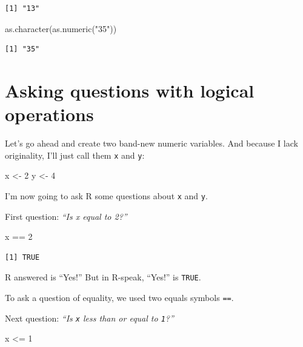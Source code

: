 \documentclass[
  letterpaper,
  DIV=11,
  numbers=noendperiod]{scrreprt}
\newenvironment{Shaded}{\begin{snugshade}}{\end{snugshade}}
\newcommand{\DecValTok}[1]{\textcolor[rgb]{0.68,0.00,0.00}{#1}}
\newcommand{\FunctionTok}[1]{\textcolor[rgb]{0.28,0.35,0.67}{#1}}
\newcommand{\NormalTok}[1]{\textcolor[rgb]{0.00,0.23,0.31}{#1}}
\newcommand{\OtherTok}[1]{\textcolor[rgb]{0.00,0.23,0.31}{#1}}
\newcommand{\SpecialCharTok}[1]{\textcolor[rgb]{0.37,0.37,0.37}{#1}}
\newcommand{\StringTok}[1]{\textcolor[rgb]{0.13,0.47,0.30}{#1}}
\begin{document}
\begin{verbatim}
[1] "13"
\end{verbatim}

\begin{Shaded}
\begin{Highlighting}[]
\FunctionTok{as.character}\NormalTok{(}\FunctionTok{as.numeric}\NormalTok{(}\StringTok{"35"}\NormalTok{))}
\end{Highlighting}
\end{Shaded}

\begin{verbatim}
[1] "35"
\end{verbatim}

\section{Asking questions with logical
operations}\label{asking-questions-with-logical-operations}

Let's go ahead and create two band-new numeric variables. And because I
lack originality, I'll just call them \texttt{x} and \texttt{y}:

\begin{Shaded}
\begin{Highlighting}[]
\NormalTok{x }\OtherTok{\textless{}{-}} \DecValTok{2}
\NormalTok{y }\OtherTok{\textless{}{-}} \DecValTok{4}
\end{Highlighting}
\end{Shaded}

I'm now going to ask R some questions about \texttt{x} and \texttt{y}.

First question: \emph{``Is x equal to 2?''}

\begin{Shaded}
\begin{Highlighting}[]
\NormalTok{x }\SpecialCharTok{==} \DecValTok{2}
\end{Highlighting}
\end{Shaded}

\begin{verbatim}
[1] TRUE
\end{verbatim}

R answered is ``Yes!'' But in R-speak, ``Yes!'' is \texttt{TRUE}.

To ask a question of equality, we used two equals symbols \texttt{==}.

Next question: \emph{``Is \texttt{x} less than or equal to
\texttt{1}?''}

\begin{Shaded}
\begin{Highlighting}[]
\NormalTok{x }\SpecialCharTok{\textless{}=} \DecValTok{1}
\end{Highlighting}
\end{Shaded}
\end{document}
